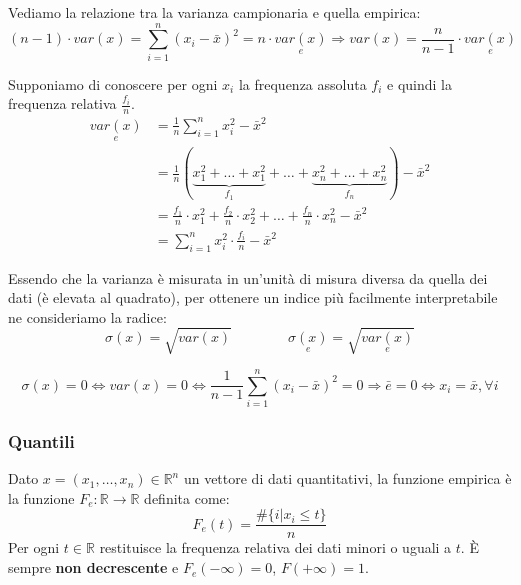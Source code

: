 \begin{observation}
	Vediamo la relazione tra la varianza campionaria e quella empirica:
	\begin{equation*}
		(n-1)\cdot var(x) = \sum_{i=1}^{n}(x_i - \bar{x})^2 = n \cdot \underset{e}{var(x)} \Rightarrow var(x) = \frac{n}{n-1}\cdot\underset{e}{var(x)}
	\end{equation*}
\end{observation}

\begin{definition}
	Supponiamo di conoscere per ogni $x_i$ la frequenza assoluta $f_i$ e quindi la frequenza relativa $\frac{f_i}{n}$.
	\begin{align}
		\underset{e}{var(x)} & =\frac{1}{n}\sum_{i=1}^{n}x_i^2 - \bar{x}^2 \\
		& = \frac{1}{n} (\underbrace{x_1^2+\ldots+x_1^2}_{f_1}+\ldots+\underbrace{x_n^2+\ldots+x_n^2}_{f_n})-\bar{x}^2\\
		& = \frac{f_1}{n}\cdot x_1^2 +\frac{f_2}{n} \cdot x_2^2 + \ldots + \frac{f_n}{n} \cdot x_n^2 - \bar{x}^2 \\
		& = \sum_{i=1}^{n} x_i^2 \cdot \frac{f_i}{n} - \bar{x}^2
	\end{align}
\end{definition}

\begin{definition}
	Essendo che la varianza è misurata in un'unità di misura diversa da quella dei dati (è elevata al quadrato), per ottenere un indice più facilmente interpretabile ne consideriamo la radice:
	\begin{equation}
		\sigma(x)=\sqrt{var(x)} \qquad \qquad \underset{e}{\sigma(x)} = \sqrt{\underset{e}{var(x)}}
	\end{equation}
\end{definition}

\begin{observation}
	\begin{equation*}
		\sigma(x) = 0\Leftrightarrow var(x)=0 \Leftrightarrow \frac{1}{n-1} \sum_{i=1}^{n}(x_i - \bar{x})^2 = 0\Rightarrow \bar{e}=0 \Leftrightarrow x_i = \bar{x}, \forall i
	\end{equation*}
\end{observation}

\subsubsection{Quantili}
\begin{definition}
	Dato $x = (x_1, \ldots, x_n) \in \mathbb{R}^n$ un vettore di dati quantitativi, la funzione empirica è la funzione $F_e:\mathbb{R} \to \mathbb{R}$ definita come:
	\begin{equation}
		F_e(t) = \frac{\#\{i \vert x_i \leq t\}}{n}
	\end{equation}
	Per ogni $t \in \mathbb{R}$ restituisce la frequenza relativa dei dati minori o uguali a $t$. È sempre \textbf{non decrescente} e $F_e(-\infty)=0$, $F(+\infty)=1$.
\end{definition}

